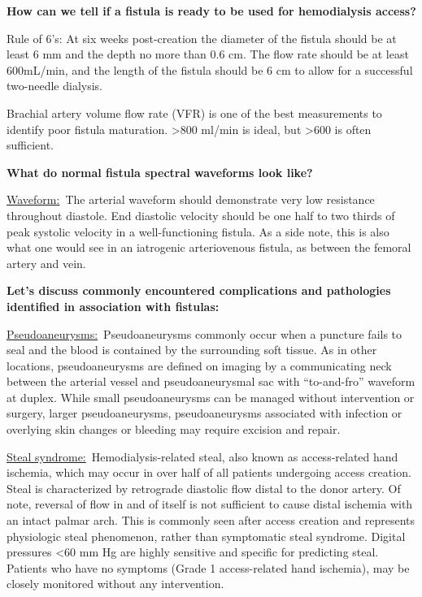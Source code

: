 \documentclass[
]{book}
\begin{document}
\textbf{How can we tell if a fistula is ready to be used for hemodialysis
access?}

Rule of 6's: At six weeks post-creation the diameter of the fistula
should be at least 6 mm and the depth no more than 0.6 cm. The flow rate
should be at least 600mL/min, and the length of the fistula should be 6
cm to allow for a successful two-needle dialysis.

Brachial artery volume flow rate (VFR) is one of the best measurements
to identify poor fistula maturation. \textgreater800 ml/min is ideal, but \textgreater600 is
often sufficient.\citep{ko2015}

\textbf{What do normal fistula spectral waveforms look like?}

\uline{Waveform:}~The arterial waveform should demonstrate very
low resistance throughout diastole. End diastolic velocity should be one
half to two thirds of peak systolic velocity in a well-functioning
fistula. As a side note, this is also what one would see in an
iatrogenic arteriovenous fistula, as between the femoral artery and
vein.\citep{teodorescu2012}

\textbf{Let's discuss commonly encountered complications and pathologies
identified in association with fistulas:}

\uline{Pseudoaneurysms:}~Pseudoaneurysms commonly occur when a
puncture fails to seal and the blood is contained by the surrounding
soft tissue. As in other locations, pseudoaneurysms are defined on
imaging by a communicating neck between the arterial vessel and
pseudoaneurysmal sac with ``to-and-fro'' waveform at duplex.\citep{mahmoud2015}
While small pseudoaneurysms can be managed without intervention or
surgery, larger pseudoaneurysms, pseudoaneurysms associated with
infection or overlying skin changes or bleeding may require excision and
repair.\citep{bandyk2013}

\uline{Steal syndrome:}~Hemodialysis-related steal, also known as
access-related hand ischemia, which may occur in over half of all
patients undergoing access creation. Steal is characterized by
retrograde diastolic flow distal to the donor artery. Of note, reversal
of flow in and of itself is not sufficient to cause distal ischemia with
an intact palmar arch. This is commonly seen after access creation and
represents physiologic steal phenomenon, rather than symptomatic steal
syndrome. Digital pressures \textless60 mm Hg are highly sensitive and specific
for predicting steal. Patients who have no symptoms (Grade 1
access-related hand ischemia), may be closely monitored without any
intervention.
\end{document}
